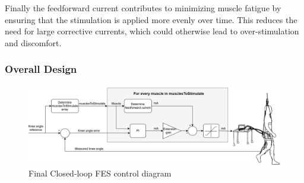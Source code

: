 Finally the feedforward current contributes to minimizing muscle fatigue by ensuring that the stimulation is applied more evenly over time. This reduces the need for large corrective currents, which could otherwise lead to over-stimulation and discomfort.

\subsubsection{Overall Design}
\begin{figure} [h]
    \centering
    \includegraphics[width=1.1\linewidth]{images/controldiam3.png}
    \caption{Final Closed-loop FES control diagram}
    \label{fig:cldiam}
\end{figure}
\newpage
